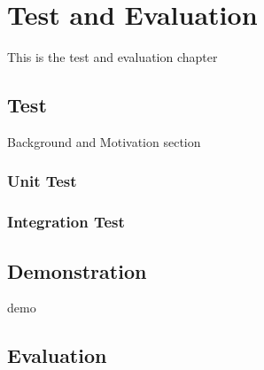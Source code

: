 \chapter{Test and Evaluation}

This is the test and evaluation chapter 

\section{Test}
Background and Motivation section
\subsection{Unit Test}
\subsection{Integration Test}

\section{Demonstration}
demo

\section{Evaluation}